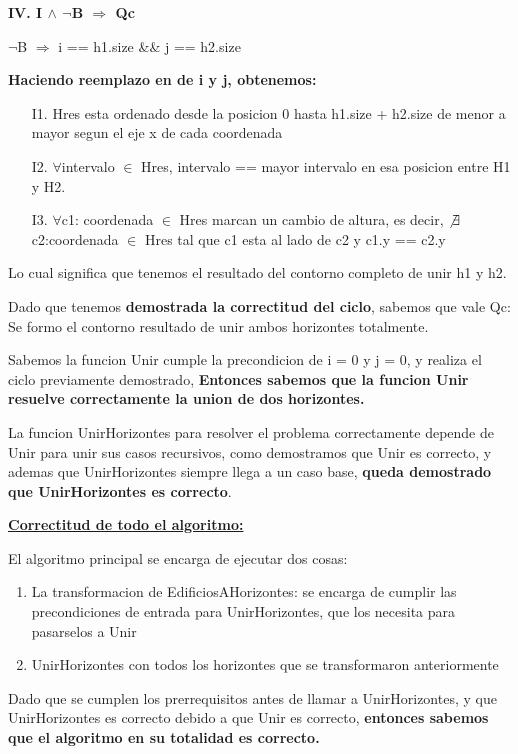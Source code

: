 \documentclass[10pt,a4paper]{article}
\begin{document}
\noindent \textbf{IV. I $\wedge$ $\neg$B $\Rightarrow$ Qc }

$\neg$B $\Rightarrow$ i == h1.size \&\& j == h2.size

\textbf{Haciendo reemplazo en de i y j, obtenemos:}

\begin{itemize}
\item[I1.] Hres esta ordenado desde la posicion 0 hasta h1.size + h2.size de menor a mayor segun el eje x de cada coordenada
\item[I2.]  $\forall$intervalo $\in$ Hres, intervalo == mayor intervalo en esa posicion entre H1 y H2.
\item[I3.]  $\forall$c1: coordenada $\in$ Hres marcan un cambio de altura, es decir, $\not\exists$ c2:coordenada $\in$ Hres tal que c1 esta al lado de c2 y c1.y == c2.y
\end{itemize}

Lo cual significa que tenemos el resultado del contorno completo de unir h1 y h2.\nopagebreak

\bigskip
Dado que tenemos \textbf{demostrada la correctitud del ciclo}, sabemos que vale Qc: Se formo el contorno resultado de unir ambos horizontes totalmente. 

Sabemos la funcion Unir cumple la precondicion de i = 0 y j = 0, y realiza el ciclo previamente demostrado, \textbf{Entonces sabemos que la funcion Unir resuelve correctamente la union de dos horizontes.}

La funcion UnirHorizontes para resolver el problema correctamente depende de Unir para unir sus casos recursivos, como demostramos que Unir es correcto, y ademas que UnirHorizontes siempre llega a un caso base, \textbf{queda demostrado que UnirHorizontes es correcto}.
\bigskip

\noindent \underline{\textbf{Correctitud de todo el algoritmo:}}

El algoritmo principal se encarga de ejecutar dos cosas:
\begin{enumerate}
\item La transformacion de EdificiosAHorizontes: se encarga de cumplir las precondiciones de entrada para UnirHorizontes, que los necesita para pasarselos a Unir
\item UnirHorizontes con todos los horizontes que se transformaron anteriormente
\end{enumerate}

Dado que se cumplen los prerrequisitos antes de llamar a UnirHorizontes, y que UnirHorizontes es correcto debido a que Unir es correcto, \textbf{entonces sabemos que el algoritmo en su totalidad es correcto.}
\end{document}
